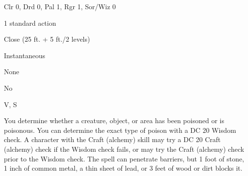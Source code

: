 
\begin{description*}
\item[Level:] Clr 0, Drd 0, Pal 1, Rgr 1, Sor/Wiz 0
\item[Casting Time:] 1 standard action
\item[Range:] Close (25 ft. + 5 ft./2 levels)
\item[Duration:] Instantaneous
\item[Saving Throw:] None
\item[Spell Resistance:] No
\item[Components:] V, S
\end{description*}

You determine whether a creature, object, or area has been poisoned or is poisonous.
You can determine the exact type of poison with a DC 20 Wisdom check. A character
with the Craft (alchemy) skill may try a DC 20 Craft (alchemy) check if the Wisdom
check fails, or may try the Craft (alchemy) check prior to the Wisdom check.
The spell can penetrate barriers, but 1 foot of stone, 1 inch of common metal,
a thin sheet of lead, or 3 feet of wood or dirt blocks it.